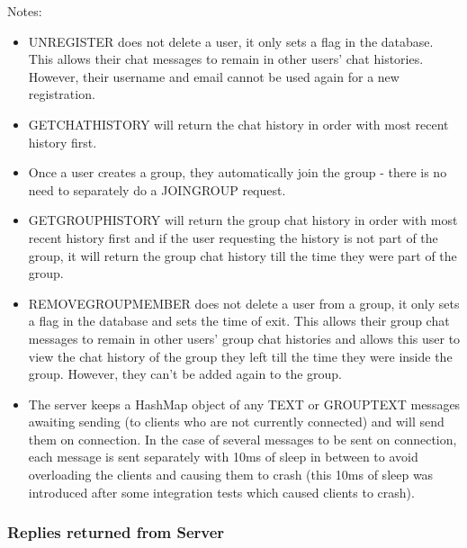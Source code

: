 Notes:
\begin{itemize} 
\item UNREGISTER does not delete a user, it only sets a flag in the database. This allows their chat messages to remain in other users' chat histories. However, their username and email cannot be used again for a new registration.
\item GETCHATHISTORY will return the chat history in order with most recent history first.
\item Once a user creates a group, they automatically join the group - there is no need to separately do a JOINGROUP request.
\item GETGROUPHISTORY will return the group chat history in order with most recent history first and if the user requesting the history is not part of the group, it will return the group chat history till the time they were part of the group.
\item REMOVEGROUPMEMBER does not delete a user from a group, it only sets a flag in the database and sets the time of exit. This allows their group chat messages to remain in other users' group chat histories and allows this user to view the chat history of the group they left till the time they were inside the group. However, they can't be added again to the group.
\item The server keeps a HashMap object of any TEXT or GROUPTEXT messages awaiting sending (to clients who are not currently connected) and will send them on connection. In the case of several messages to be sent on connection, each message is sent separately with 10ms of sleep in between to avoid overloading the clients and causing them to crash (this 10ms of sleep was introduced after some integration tests which caused clients to crash).
\end{itemize}


\subsubsection{Replies returned from Server}
\label{repliesFromServer}



